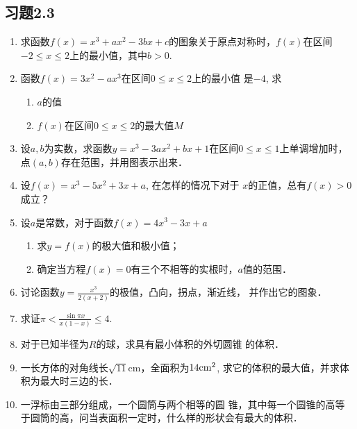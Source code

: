     \subsection*{习题2.3}
    \begin{enumerate}
        \item 求函数$f(x)=x^3+ax^2-3bx+c$的图象关于原点对称时，$f(x)$在区间$-2\le x\le 2$上的最小值，其中$b>0$.
        
        \item 函数$f(x)=3x^2-ax^3$在区间$0\le x\le 2$上的最小值
        是$-4$, 求
    \begin{enumerate}
        \item $a$的值
        \item $f(x)$在区间$0\le x\le 2$的最大值$M$
    \end{enumerate}
    \item 设$a,b$为实数，求函数$y=x^3-3ax^2+bx+1$在区间$0\le x\le 1$上单调增加时，点$(a,b)$存在范围，并用图表示出来．
    
    \item 设$f(x)=x^3-5x^2+3x+a$, 在怎样的情况下对于
    $x$的正值，总有$f(x)>0$成立？
    \item 设$a$是常数，对于函数$f(x)=4x^3-3x+a$
    \begin{enumerate}
        \item 求$y=f(x)$的极大值和极小值；
        \item 确定当方程$f(x)=0$有三个不相等的实根时，$a$值的范围．
    \end{enumerate}
    
    \item 讨论函数$y=\frac{x^3}{2 (x+2)}$的极值，凸向，拐点，渐近线，
    并作出它的图象．
    
    \item 求证$\pi<\frac{\sin\pi x}{x(1-x)}\le 4$.
    \item 对于已知半径为$R$的球，求具有最小体积的外切圆锥
    的体积．
    \item 一长方体的对角线长$\sqrt{11}$cm，全面积为$14{\rm cm}^2$, 求它的体积的最大值，并求体积为最大时三边的长．
    \item 一浮标由三部分组成，一个圆筒与两个相等的圆
    锥，其中每一个圆锥的高等于圆筒的高，问当表面积一定时，什么样的形状会有最大的体积．
    \end{enumerate}     
    

